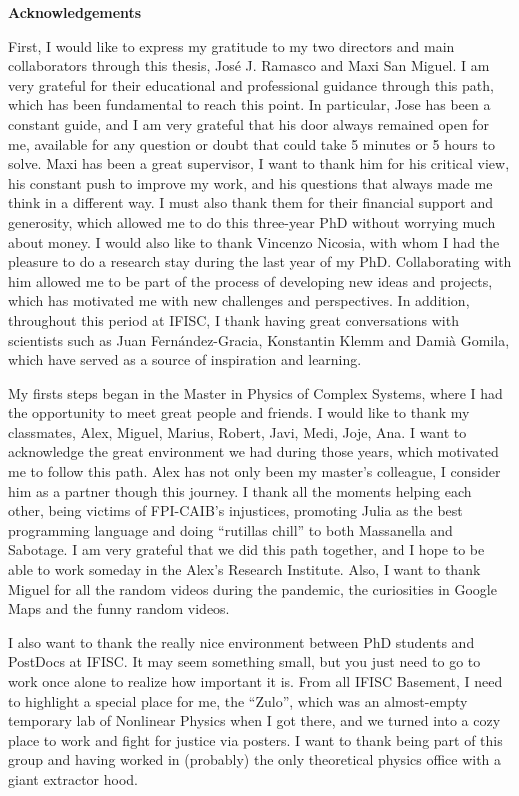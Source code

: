 \pagebreak
\frontmatter
\thispagestyle{empty}
{}
\textbf{ \huge Acknowledgements}

\vspace*{0.5 cm}

First, I would like to express my gratitude to my two directors and main collaborators through this thesis, Jos\'e J. Ramasco and Maxi San Miguel. I am very grateful for their educational and professional guidance through this path, which has been fundamental to reach this point. In particular, Jose has been a constant guide, and I am very grateful that his door always remained open for me, available for any question or doubt that could take 5 minutes or 5 hours to solve. Maxi has been a great supervisor, I want to thank him for his critical view, his constant push to improve my work, and his questions that always made me think in a different way. I must also thank them for their financial support and generosity, which allowed me to do this three-year PhD without worrying much about money. I would also like to thank Vincenzo Nicosia, with whom I had the pleasure to do a research stay during the last year of my PhD. Collaborating with him allowed me to be part of the process of developing new ideas and projects, which has motivated me with new challenges and perspectives. In addition, throughout this period at IFISC, I thank having great conversations with scientists such as Juan Fern\'andez-Gracia, Konstantin Klemm and Damià Gomila, which have served as a source of inspiration and learning.

My firsts steps began in the Master in Physics of Complex Systems, where I had the opportunity to meet great people and friends. I would like to thank my classmates, Alex, Miguel, Marius, Robert, Javi, Medi, Joje, Ana. I want to acknowledge the great environment we had during those years, which motivated me to follow this path. Alex has not only been my master's colleague, I consider him as a partner though this journey. I thank all the moments helping each other, being victims of FPI-CAIB's injustices, promoting Julia as the best programming language and doing ``rutillas chill'' to both Massanella and Sabotage. I am very grateful that we did this path together, and I hope to be able to work someday in the Alex's Research Institute. Also, I want to thank Miguel for all the random videos during the pandemic, the curiosities in Google Maps and the funny random videos.

I also want to thank the really nice environment between PhD students and PostDocs at IFISC. It may seem something small, but you just need to go to work once alone to realize how important it is. From all IFISC Basement, I need to highlight a special place for me, the ``Zulo'', which was an almost-empty temporary lab of Nonlinear Physics when I got there, and we turned into a cozy place to work and fight for justice via posters. I want to thank being part of this group and having worked in (probably) the only theoretical physics office with a giant extractor hood.

